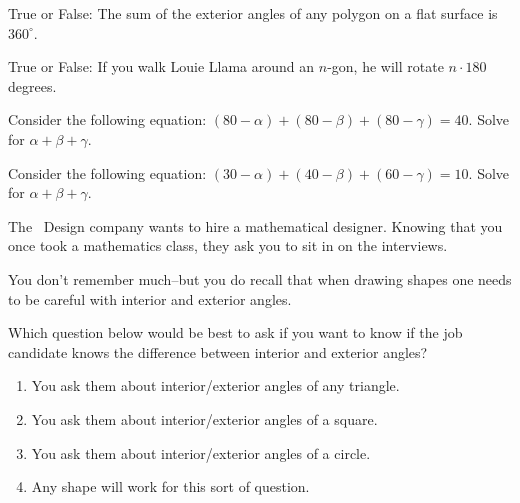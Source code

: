 \documentclass[noauthor,nooutcomes]{ximera}
\author{Claire Merriman and Bart Snapp}
\begin{document}
\maketitle

\begin{exercise}
  True or False:
 The sum of the exterior angles of any polygon on a flat surface is $360^\circ$.
\end{exercise}

\begin{exercise}
  True or False: If you walk Louie Llama around an $n$-gon, he will
  rotate $n\cdot 180$ degrees.
\end{exercise}




\begin{exercise}
 Consider the following equation: $(80-\alpha)+(80-\beta)+(80-\gamma)=40$. Solve for $\alpha+\beta+\gamma$.
\end{exercise}



\begin{exercise}
 Consider the following equation: $(30-\alpha)+(40-\beta)+(60-\gamma)=10$. Solve for $\alpha+\beta+\gamma$.
\end{exercise}


\begin{exercise}
The \mooculus~Design company wants to hire a mathematical
designer. Knowing that you once took a mathematics class, they ask you
to sit in on the interviews.


You don't remember much--but you do recall that when drawing shapes
one needs to be careful with interior and exterior angles.

 

Which question below would be best to ask if you want to know if the
job candidate knows the difference between interior and exterior
angles?

\begin{enumerate}
\item You ask them about interior/exterior angles of any
  triangle.
\item You ask them about interior/exterior angles of a square.
\item You ask them about interior/exterior angles of a circle.
\item Any shape will work for this sort of question.
\end{enumerate}

\end{exercise}






\end{document}
